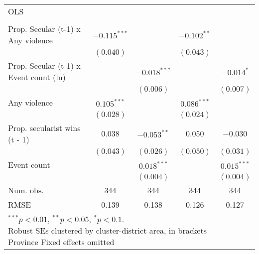 
\begin{tabular}{l c c c c }
\hline
 &  &  &  &  \\
\hline
OLS                                          &                &                &               &               \\
                                             &                &                &               &               \\
\quad Prop. Secular (t-1) x Any violence     & $-0.115^{***}$ &                & $-0.102^{**}$ &               \\
                                             & $(0.040)$      &                & $(0.043)$     &               \\
\quad Prop. Secular (t-1) x Event count (ln) &                & $-0.018^{***}$ &               & $-0.014^{*}$  \\
                                             &                & $(0.006)$      &               & $(0.007)$     \\
\quad Any violence                           & $0.105^{***}$  &                & $0.086^{***}$ &               \\
                                             & $(0.028)$      &                & $(0.024)$     &               \\
\quad Prop. secularist wins (t - 1)          & $0.038$        & $-0.053^{**}$  & $0.050$       & $-0.030$      \\
                                             & $(0.043)$      & $(0.026)$      & $(0.050)$     & $(0.031)$     \\
Event count                                  &                & $0.018^{***}$  &               & $0.015^{***}$ \\
                                             &                & $(0.004)$      &               & $(0.004)$     \\
\hline
Num. obs.                                    & 344            & 344            & 344           & 344           \\
RMSE                                         & 0.139          & 0.138          & 0.126         & 0.127         \\
\hline
\multicolumn{5}{l}{\scriptsize{\parbox{.4\linewidth}{\vspace{2pt}$^{***}p<0.01$, $^{**}p<0.05$, $^*p<0.1$. \\
       Robust SEs clustered by cluster-district area, in brackets \\ Province Fixed effects omitted}}}
\end{tabular}
